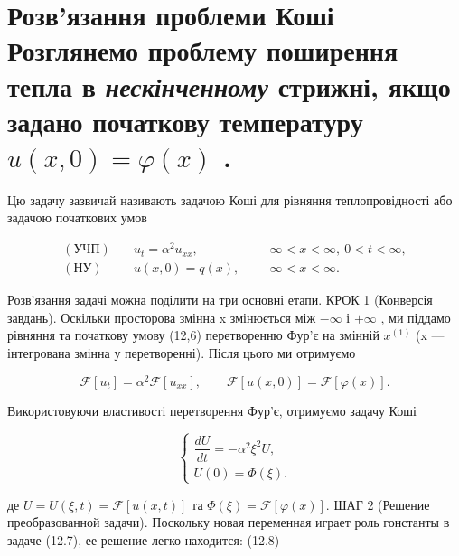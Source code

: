 \documentclass[
  ukrainian,
]{article}
\begin{document}
\section{\texorpdfstring{Розв'язання проблеми Коші Розглянемо проблему
поширення тепла в \emph{нескінченному} стрижні, якщо задано початкову
температуру \(u(x, 0) = \varphi(x)\)
.}{Розв'язання проблеми Коші Розглянемо проблему поширення тепла в нескінченному стрижні, якщо задано початкову температуру u(x, 0) = \textbackslash varphi(x) .}}\label{ux440ux43eux437ux432ux44fux437ux430ux43dux43dux44f-ux43fux440ux43eux431ux43bux435ux43cux438-ux43aux43eux448ux456-ux440ux43eux437ux433ux43bux44fux43dux435ux43cux43e-ux43fux440ux43eux431ux43bux435ux43cux443-ux43fux43eux448ux438ux440ux435ux43dux43dux44f-ux442ux435ux43fux43bux430-ux432-ux43dux435ux441ux43aux456ux43dux447ux435ux43dux43dux43eux43cux443-ux441ux442ux440ux438ux436ux43dux456-ux44fux43aux449ux43e-ux437ux430ux434ux430ux43dux43e-ux43fux43eux447ux430ux442ux43aux43eux432ux443-ux442ux435ux43cux43fux435ux440ux430ux442ux443ux440ux443-ux-0-varphix-.}

Цю задачу зазвичай називають задачою Коші для рівняння теплопровідності
або задачою початкових умов

\[
\begin{aligned}
(\text{УЧП})\quad & u_t=\alpha^2u_{xx}, && -\infty<x<\infty,\ 0<t<\infty,\\
(\text{НУ})\quad & u(x,0)=q(x), && -\infty<x<\infty.
\end{aligned}
\]

Розв'язання задачі можна поділити на три основні етапи. КРОК 1
(Конверсія завдань). Оскільки просторова змінна x змінюється між
\(-\infty\) і \(+\infty\) , ми піддамо рівняння та початкову умову
(12,6) перетворенню Фур'є на змінній \(x^{(1)}\) (x --- інтегрована
змінна у перетворенні). Після цього ми отримуємо

\[
\mathcal{F}[u_t] = \alpha^2 \mathcal{F}[u_{xx}],\qquad
\mathcal{F}[u(x,0)] = \mathcal{F}[\varphi(x)].
\]

Використовуючи властивості перетворення Фур'є, отримуємо задачу Коші

\[
\begin{cases}
\dfrac{dU}{dt}=-\alpha^2\xi^2U,\\
U(0)=\Phi(\xi).
\end{cases}
\]

де \(U=U(\xi,t)=\mathcal{F}[u(x,t)]\) та
\(\Phi(\xi)=\mathcal{F}[\varphi(x)]\). ШАГ 2 (Решение преобразованной
задачи). Поскольку новая переменная играет роль гонстанты в задаче
(12.7), ее решение легко находится: (12.8)
\end{document}
